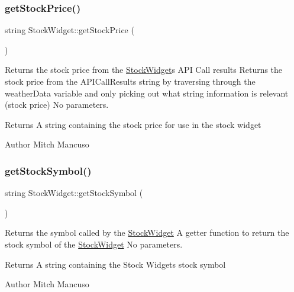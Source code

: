 \subsubsection{\texorpdfstring{get\+Stock\+Price()}{getStockPrice()}}
{\footnotesize\ttfamily string Stock\+Widget\+::get\+Stock\+Price (\begin{DoxyParamCaption}{ }\end{DoxyParamCaption})}



Returns the stock price from the \mbox{\hyperlink{class_stock_widget}{Stock\+Widget}}\textquotesingle{}s A\+PI Call results  Returns the stock price from the A\+P\+I\+Call\+Results string by traversing through the weather\+Data variable and only picking out what string information is relevant (stock price)  No parameters. 

\begin{DoxyReturn}{Returns}
A string containing the stock price for use in the stock widget 
\end{DoxyReturn}
\begin{DoxyAuthor}{Author}
Mitch Mancuso 
\end{DoxyAuthor}
\mbox{\label{class_stock_widget_a69debafcc6d655a83e4e3af67a78e8c3}} 
\subsubsection{\texorpdfstring{get\+Stock\+Symbol()}{getStockSymbol()}}
{\footnotesize\ttfamily string Stock\+Widget\+::get\+Stock\+Symbol (\begin{DoxyParamCaption}{ }\end{DoxyParamCaption})}



Returns the symbol called by the \mbox{\hyperlink{class_stock_widget}{Stock\+Widget}}  A getter function to return the stock symbol of the \mbox{\hyperlink{class_stock_widget}{Stock\+Widget}}  No parameters. 

\begin{DoxyReturn}{Returns}
A string containing the Stock Widget\textquotesingle{}s stock symbol 
\end{DoxyReturn}
\begin{DoxyAuthor}{Author}
Mitch Mancuso 
\end{DoxyAuthor}
\mbox{\label{class_stock_widget_ab29e0ec75f29ecc1b1a16423de40ac46}} 
